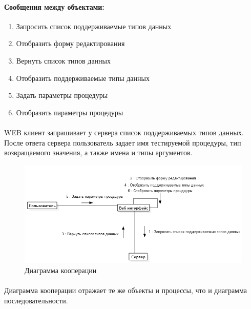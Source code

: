 \documentclass{article}
\begin{document}
        \paragraph{Сообщения между объектами:}
        \begin{enumerate}
            \item Запросить список поддерживаемые типов данных
            \item Отобразить форму редактирования
            \item Вернуть список типов данных
            \item Отобразить поддерживаемые типы данных
            \item Задать параметры процедуры
            \item Отобразить параметры процедуры
        \end{enumerate}
        \paragraph{}
        WEB клиент запрашивает у сервера список поддерживаемых типов данных.
        После ответа сервера пользователь задает имя тестируемой процедуры,
        тип возвращаемого значения, а также имена и типы аргументов.
        \begin{figure}[H]
            \includegraphics[width=\textwidth, center]
                {Communication_SetFunctionSignature}
            \caption{Диаграмма кооперации}
        \end{figure}
        \paragraph{}
        Диаграмма кооперации отражает те же объекты и процессы, что и диаграмма
        последовательности.
\end{document}
